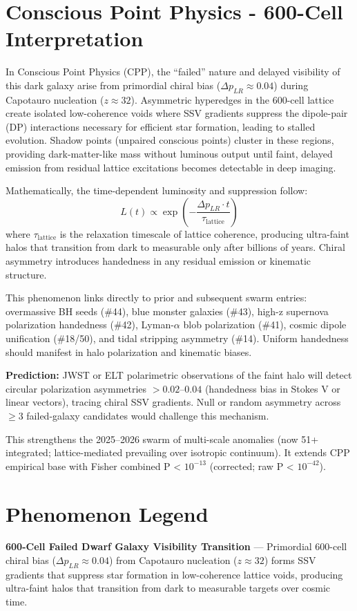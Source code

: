 \documentclass[11pt]{article}
\begin{document}
\section{Conscious Point Physics - 600-Cell Interpretation}
In Conscious Point Physics (CPP), the ``failed'' nature and delayed visibility of this dark galaxy arise from primordial chiral bias ($\Delta p_{LR} \approx 0.04$) during Capotauro nucleation ($z \approx 32$). Asymmetric hyperedges in the 600-cell lattice create isolated low-coherence voids where SSV gradients suppress the dipole-pair (DP) interactions necessary for efficient star formation, leading to stalled evolution. Shadow points (unpaired conscious points) cluster in these regions, providing dark-matter-like mass without luminous output until faint, delayed emission from residual lattice excitations becomes detectable in deep imaging.

Mathematically, the time-dependent luminosity and suppression follow:  
\[
L(t) \propto \exp\left(-\frac{\Delta p_{LR} \cdot t}{\tau_{\text{lattice}}}\right)
\]  
where $\tau_{\text{lattice}}$ is the relaxation timescale of lattice coherence, producing ultra-faint halos that transition from dark to measurable only after billions of years. Chiral asymmetry introduces handedness in any residual emission or kinematic structure.

This phenomenon links directly to prior and subsequent swarm entries: overmassive BH seeds (\#44), blue monster galaxies (\#43), high-z supernova polarization handedness (\#42), Lyman-$\alpha$ blob polarization (\#41), cosmic dipole unification (\#18/50), and tidal stripping asymmetry (\#14). Uniform handedness should manifest in halo polarization and kinematic biases.

\textbf{Prediction:} JWST or ELT polarimetric observations of the faint halo will detect circular polarization asymmetries $> 0.02$--$0.04$ (handedness bias in Stokes V or linear vectors), tracing chiral SSV gradients. Null or random asymmetry across $\geq 3$ failed-galaxy candidates would challenge this mechanism.

This strengthens the 2025--2026 swarm of multi-scale anomalies (now 51+ integrated; lattice-mediated prevailing over isotropic continuum). It extends CPP empirical base with Fisher combined P < $10^{-13}$ (corrected; raw P < $10^{-42}$).

\section{Phenomenon Legend}
\textbf{600-Cell Failed Dwarf Galaxy Visibility Transition} — Primordial 600-cell chiral bias ($\Delta p_{LR} \approx 0.04$) from Capotauro nucleation ($z \approx 32$) forms SSV gradients that suppress star formation in low-coherence lattice voids, producing ultra-faint halos that transition from dark to measurable targets over cosmic time.
\end{document}
